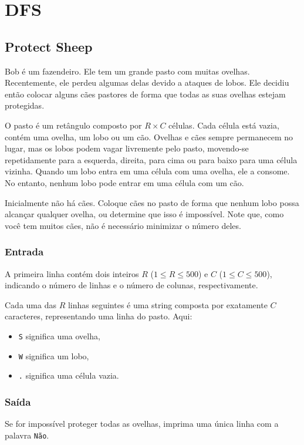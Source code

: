 \section{DFS}
\subsection{Protect Sheep}
Bob é um fazendeiro. Ele tem um grande pasto com muitas ovelhas. Recentemente, ele perdeu algumas delas devido a ataques de lobos. Ele decidiu então colocar alguns cães pastores de forma que todas as suas ovelhas estejam protegidas.

O pasto é um retângulo composto por \( R \times C \) células. Cada célula está vazia, contém uma ovelha, um lobo ou um cão. Ovelhas e cães sempre permanecem no lugar, mas os lobos podem vagar livremente pelo pasto, movendo-se repetidamente para a esquerda, direita, para cima ou para baixo para uma célula vizinha. Quando um lobo entra em uma célula com uma ovelha, ele a consome. No entanto, nenhum lobo pode entrar em uma célula com um cão.

Inicialmente não há cães. Coloque cães no pasto de forma que nenhum lobo possa alcançar qualquer ovelha, ou determine que isso é impossível. Note que, como você tem muitos cães, não é necessário minimizar o número deles.

\subsubsection*{Entrada}
A primeira linha contém dois inteiros \( R \) (\(1 \le R \le 500\)) e \( C \) (\(1 \le C \le 500\)), indicando o número de linhas e o número de colunas, respectivamente.

Cada uma das \( R \) linhas seguintes é uma string composta por exatamente \( C \) caracteres, representando uma linha do pasto. Aqui:
\begin{itemize}
    \item \texttt{S} significa uma ovelha,
    \item \texttt{W} significa um lobo,
    \item \texttt{.} significa uma célula vazia.
\end{itemize}

\subsubsection*{Saída}
Se for impossível proteger todas as ovelhas, imprima uma única linha com a palavra \texttt{Não}.


